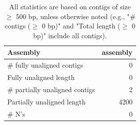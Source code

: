 \documentclass[12pt,a4paper]{article}
\begin{document}
\begin{table}[ht]
\begin{center}
\caption{All statistics are based on contigs of size $\geq$ 500 bp, unless otherwise noted (e.g., "\# contigs ($\geq$ 0 bp)" and "Total length ($\geq$ 0 bp)" include all contigs).}
\begin{tabular}{|l*{1}{|r}|}
\hline
Assembly & assembly \\ \hline
\# fully unaligned contigs & 0 \\ \hline
Fully unaligned length & 0 \\ \hline
\# partially unaligned contigs & 2 \\ \hline
Partially unaligned length & 4200 \\ \hline
\# N's & 0 \\ \hline
\end{tabular}
\end{center}
\end{table}
\end{document}
